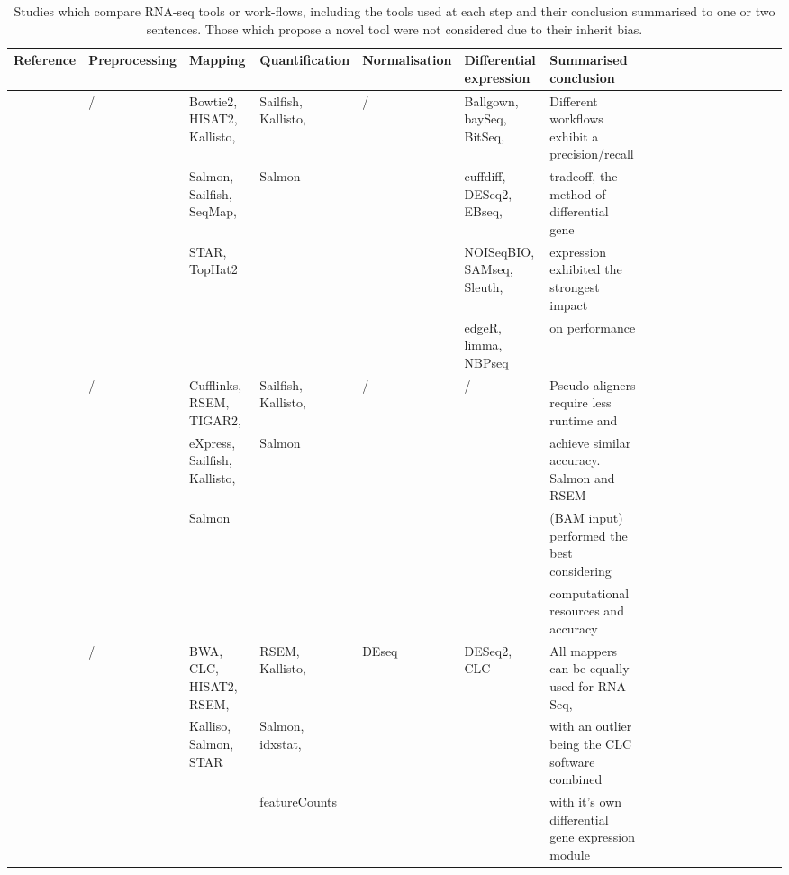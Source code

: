 \begin{landscape}
	\pagestyle{empty}
\label{tab:test}
\begin{table}[h]
	\tiny
    \centering
    \captionsetup{font=scriptsize}
    \caption{Studies which compare RNA-seq tools or work-flows, including the tools used at each step and their conclusion summarised to one or two sentences. Those which propose a novel tool were not considered due to their inherit bias.}
    \begin{adjustwidth}{-1cm}{}
    \begin{tabular}{llllllllllllllllll}
		\toprule
        \textbf{Reference} & \textbf{Preprocessing} & \textbf{Mapping} & \textbf{Quantification} & \textbf{Normalisation} & \textbf{Differential expression} & \textbf{Summarised conclusion}  \\ \midrule
        \cite{williams2017empirical} & / &  Bowtie2, HISAT2, Kallisto, & Sailfish, Kallisto,  & / & Ballgown, baySeq, BitSeq,  & Different workflows exhibit a precision/recall   \\ 
        ~ & ~ &  Salmon, Sailfish, SeqMap,  & Salmon & ~ & cuffdiff, DESeq2, EBseq,  & tradeoff,  the method of differential gene  \\ 
        ~ & ~ & STAR, TopHat2 & ~ & ~ & NOISeqBIO, SAMseq, Sleuth,  &  expression exhibited the strongest impact  \\ 
        ~ & ~ & ~ & ~ & ~ & edgeR, limma, NBPseq &  on performance  \\ \hline
        \cite{Zhang2017} & / & Cufflinks, RSEM, TIGAR2,  & Sailfish, Kallisto,  & / & / & Pseudo-aligners require less runtime and   \\ 
        ~ & ~ & eXpress, Sailfish, Kallisto,  & Salmon & ~ & ~ & achieve similar accuracy. Salmon and RSEM  \\
        ~ & ~ & Salmon & ~ & ~ & ~ &  (BAM input) performed the best considering  \\ 
        ~ & ~ & ~ & ~ & ~ & ~ &  computational resources and accuracy  \\ \hline
        \cite{Schaarschmidt2020} & / & BWA, CLC, HISAT2, RSEM,   & RSEM, Kallisto,  &  DEseq & DESeq2, CLC & All mappers can be equally used for RNA-Seq,    \\ 
        ~ & ~ & Kalliso, Salmon, STAR & Salmon,  idxstat, & ~ & ~ & with an outlier being the CLC software combined   \\ 
        ~ & ~ & ~ & featureCounts & ~ & ~ & with it's own differential gene expression module  \\ 

\end{tabular}
\end{adjustwidth}
\end{table}
\end{landscape}

